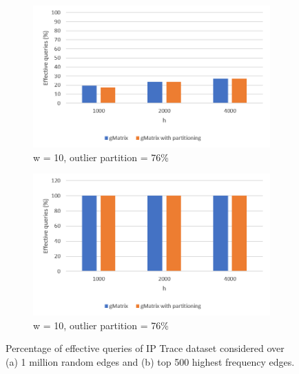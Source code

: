 \begin{figure}[!htbp]
\centering
\begin{subfigure}{.5\textwidth}
  \centering
  \includegraphics[width=1\linewidth]{I3}
  \caption{w = 10, outlier partition = 76\%}
  \label{fig:sub1}
\end{subfigure}%
\begin{subfigure}{.5\textwidth}
  \centering
  \includegraphics[width=1\linewidth]{I3T}
  \caption{w = 10, outlier partition = 76\%}
  \label{fig:sub2}
\end{subfigure}
\caption{Percentage of effective queries of IP Trace dataset considered over (a) 1 million random edges and (b) top 500 highest frequency edges.}
\label{fig:i3}
\end{figure}

